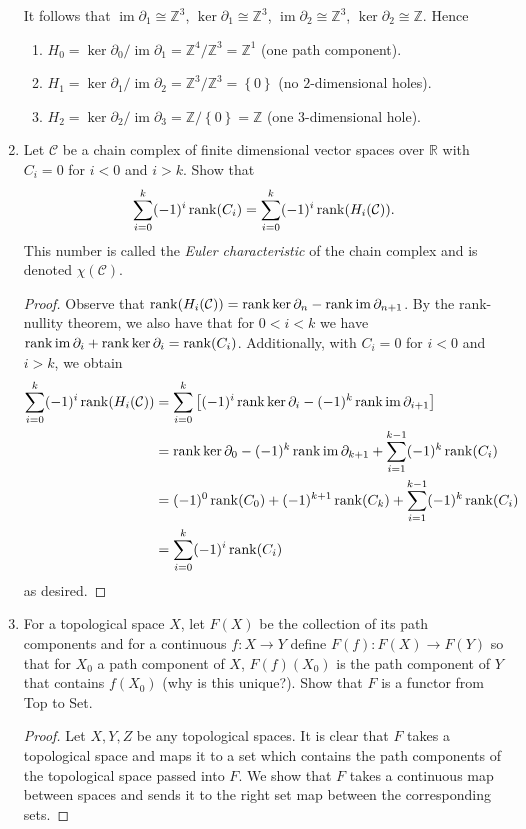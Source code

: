 \documentclass[11pt]{article}
\newcommand{\sbr}[1]{\left[#1\right]}
\newcommand{\cbr}[1]{\left\{#1\right\}}
\DeclareMathOperator{\im}{im}
\begin{document}
\begin{enumerate}
    It follows that $\im\partial_1\cong \mathbb{Z}^3$, $\ker\partial_1\cong \mathbb{Z}^3$, $\im\partial_2\cong \mathbb{Z}^3$, $\ker\partial_2\cong \mathbb{Z}$. Hence \begin{enumerate}
        \item $H_0 = \ker\partial_0/\im\partial_1 = \mathbb{Z}^4/\mathbb{Z}^3 = \mathbb{Z}^1$ (one path component).
        \item $H_1 = \ker\partial_1/\im\partial_2 = \mathbb{Z}^3/\mathbb{Z}^3 = \cbr{0}$ (no $2$-dimensional holes).
        \item $H_2 = \ker\partial_2/\im\partial_3 = \mathbb{Z}/\cbr{0} = \mathbb{Z}$ (one $3$-dimensional hole).
    \end{enumerate}
    \item Let $\mathcal{C}$ be a chain complex of finite dimensional vector spaces over $\mathbb{R}$ with $C_i = 0$ for $i<0$ and $i>k$. Show that \[\sum_{i=0}^k (-1)^i\rank(C_i) = \sum_{i=0}^k (-1)^i\rank(H_i(\mathcal{C})).\] This number is called the \textit{Euler characteristic} of the chain complex and is denoted $\chi(\mathcal{C})$. \begin{proof}
        Observe that $\rank(H_i(\mathcal{C})) = \rank\ker\partial_n - \rank\im\partial_{n+1}$. By the rank-nullity theorem, we also have that for $0<i<k$ we have $\rank\im\partial_i + \rank\ker\partial_i = \rank (C_i)$. Additionally, with $C_i = 0$ for $i<0$ and $i>k$, we obtain \begin{align*}
            \sum_{i=0}^k (-1)^i\rank(H_i(\mathcal{C})) &= \sum_{i=0}^k \sbr{(-1)^i\rank\ker\partial_i - (-1)^{k}\rank\im\partial_{i+1}}\\
            &= \rank\ker\partial_0 - (-1)^{k}\rank\im\partial_{k+1} + \sum_{i=1}^{k-1}(-1)^k\rank(C_i)\\
            &= (-1)^0\rank(C_0) + (-1)^{k+1}\rank(C_k)+ \sum_{i=1}^{k-1}(-1)^k\rank(C_i)\\
            &= \sum_{i=0}^k (-1)^i\rank(C_i)
        \end{align*} as desired.
    \end{proof}
    \item For a topological space $X$, let $F(X)$ be the collection of its path components and for a continuous $f\colon X\to Y$ define $F(f)\colon F(X)\to F(Y)$ so that for $X_0$ a path component of $X$, $F(f)(X_0)$ is the path component of $Y$ that contains $f(X_0)$ (why is this unique?). Show that $F$ is a functor from Top to Set. \begin{proof}
        Let $X,Y,Z$ be any topological spaces. It is clear that $F$ takes a topological space and maps it to a set which contains the path components of the topological space passed into $F$. We show that $F$ takes a continuous map between spaces and sends it to the right set map between the corresponding sets. 


\end{proof}
\end{enumerate}
\end{document}
